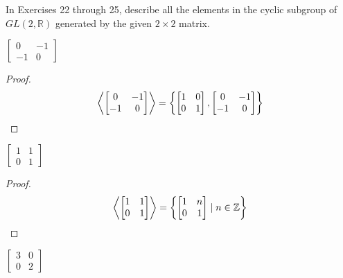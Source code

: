 In Exercises 22 through 25, describe all the elements in the cyclic subgroup of $GL(2, \mathbb{R})$ generated by the given $2\times 2$ matrix.

\newpage
\begin{exercise}
    $\begin{bmatrix}
            0  & -1 \\
            -1 & 0
        \end{bmatrix}$
\end{exercise}

\begin{proof}
    \[
        \left\langle{\begin{bmatrix}
                0  & -1 \\
                -1 & 0
            \end{bmatrix}}\right\rangle = \left\{
        \begin{bmatrix}
            1 & 0 \\
            0 & 1
        \end{bmatrix},
        \begin{bmatrix}
            0  & -1 \\
            -1 & 0
        \end{bmatrix}
        \right\}
    \]
\end{proof}

\newpage
\begin{exercise}
    $\begin{bmatrix}
            1 & 1 \\
            0 & 1
        \end{bmatrix}$
\end{exercise}

\begin{proof}
    \[
        \left\langle{\begin{bmatrix}
                1 & 1 \\
                0 & 1
            \end{bmatrix}}\right\rangle = \left\{
        \begin{bmatrix}
            1 & n \\
            0 & 1
        \end{bmatrix} \mid n\in\mathbb{Z}
        \right\}
    \]
\end{proof}

\newpage
\begin{exercise}
    $\begin{bmatrix}
            3 & 0 \\
            0 & 2
        \end{bmatrix}$
\end{exercise}

